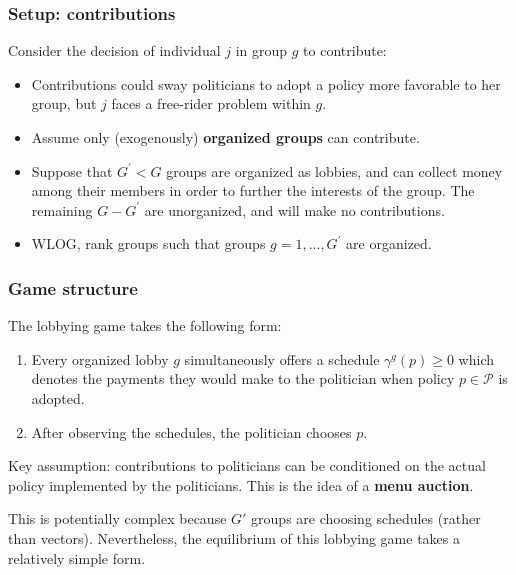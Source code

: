 \documentclass[11pt,aspectratio=169]{beamer}
\begin{document}
\begin{frame}

\frametitle{Setup: contributions}


Consider the decision of individual $j$ in group $g$ to contribute:
\pause
\begin{itemize}

\item Contributions could sway politicians to adopt a policy more favorable to her group, but $j$ faces a free-rider problem within $g$.
\pause

\item Assume only (exogenously) \textbf{organized groups} can contribute.
\pause

\item Suppose that $G^{\prime }<G$ groups are organized as lobbies, and can collect money among their members in order to further the interests of the group. The remaining $G-G^{\prime }$ are unorganized, and will make no contributions.
\pause

\item WLOG, rank groups such that groups $g=1,...,G^{\prime }$ are organized.

\end{itemize}



\end{frame}


\begin{frame}

\frametitle{Game structure}

The lobbying game takes the following form: 

\pause
\begin{enumerate}
\item Every organized lobby $g$ simultaneously offers a schedule $\gamma^{g}\left( p\right) \geq 0$ which denotes the payments they would make to the politician when policy $p\in \mathcal{P}$ is adopted.
\pause

\item After observing the schedules, the politician chooses $p$.
\end{enumerate}

\pause

\begin{tcolorbox}
Key assumption: contributions to politicians can be conditioned on the actual policy implemented by the politicians. This is the idea of a \textbf{menu auction}.
\end{tcolorbox}

This is potentially complex because $G'$ groups are choosing schedules (rather than vectors). Nevertheless, the equilibrium of this lobbying game takes a relatively simple form.

\end{frame}
\end{document}
